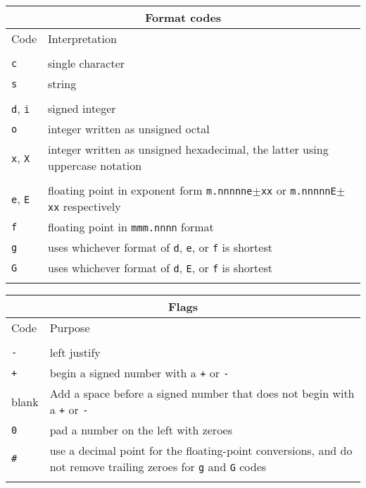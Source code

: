 \documentclass[twoside,11pt]{article}
\begin{document}
\begin{minipage}{75mm}
\vspace*{3mm}
\begin{tabular}{lp{61mm}}
\hline
\multicolumn{2}{c}{Format codes} \\ \hline
Code & Interpretation \\ \hline
\vspace*{-\medskipamount} \\
{\tt c} & single character \\
{\tt s} & string \\
\\
{\tt d}, {\tt i} & signed integer \\
{\tt o} & integer written as unsigned octal \\
{\tt x}, {\tt X} & integer written as unsigned hexadecimal, the
           latter using uppercase notation \\
\\
{\tt e}, {\tt E} & floating point in exponent form {\tt m.nnnnne$\pm$xx}
                       or {\tt m.nnnnnE$\pm$xx} respectively \\
{\tt f} & floating point in {\tt mmm.nnnn} format\\
{\tt g} & uses whichever format of {\tt d}, {\tt e}, or {\tt f}
          is shortest \\ 
{\tt G} & uses whichever format of {\tt d}, {\tt E}, or {\tt f}
          is shortest \\ 
\vspace*{-\medskipamount} \\ \hline
\end{tabular}

\vspace*{10mm}
\begin{tabular}{lp{61mm}}
\hline
\multicolumn{2}{c}{Flags} \\ \hline
Code & Purpose \\ \hline
\vspace*{-\medskipamount} \\
{\tt -} & left justify \\
{\tt +} & begin a signed number with a {\tt +} or {\tt -} \\
blank & Add a space before a signed number that does not begin with a
          {\tt +} or {\tt -} \\
{\tt 0} & pad a number on the left with zeroes \\
{\tt \#} & use a decimal point for the floating-point conversions, and
do not remove trailing zeroes for {\tt g} and {\tt G} codes \\
\vspace*{-\medskipamount} \\ \hline
\end{tabular}

\end{minipage}
\vspace*{2mm}
\end{document}
